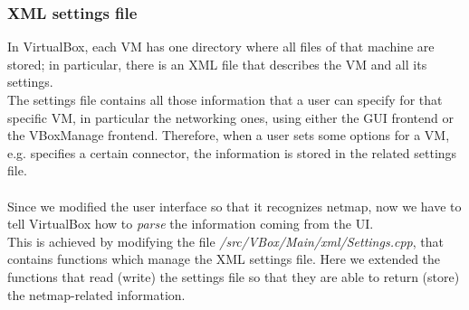 \documentclass[a4paper, 12pt, titlepage]{report}
\begin{document}
\subsubsection{XML settings file}
In VirtualBox, each VM has one directory where all files of that machine are stored; in particular, there is an XML file that describes the VM and all its settings.
\\
The settings file contains all those information that a user can specify for that specific VM, in particular the networking ones, using either the GUI frontend or the VBoxManage frontend. Therefore, when a user sets some options for a VM, e.g. specifies a certain connector, the information is stored in the related settings file.
\\
\\
Since we modified the user interface so that it recognizes netmap, now we have to tell VirtualBox how to \textit{parse} the information coming from the UI.
\\
This is achieved by modifying the file \textit{/src/VBox/Main/xml/Settings.cpp}, that contains functions which manage the XML settings file. Here we extended the functions that read (write) the settings file so that they are able to return (store) the netmap-related information.
\end{document}
